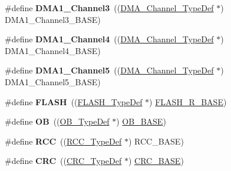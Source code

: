 \begin{DoxyCompactItemize}
\#define {\bfseries D\+M\+A1\+\_\+\+Channel3}~((\hyperlink{struct_d_m_a___channel___type_def}{D\+M\+A\+\_\+\+Channel\+\_\+\+Type\+Def} $\ast$) D\+M\+A1\+\_\+\+Channel3\+\_\+\+B\+A\+SE)
\item 
\mbox{\label{group___peripheral__declaration_gad2c42743316bf64da557130061b1f56a}} 
\#define {\bfseries D\+M\+A1\+\_\+\+Channel4}~((\hyperlink{struct_d_m_a___channel___type_def}{D\+M\+A\+\_\+\+Channel\+\_\+\+Type\+Def} $\ast$) D\+M\+A1\+\_\+\+Channel4\+\_\+\+B\+A\+SE)
\item 
\mbox{\label{group___peripheral__declaration_ga06ff98ddef3c962795d2e2444004abff}} 
\#define {\bfseries D\+M\+A1\+\_\+\+Channel5}~((\hyperlink{struct_d_m_a___channel___type_def}{D\+M\+A\+\_\+\+Channel\+\_\+\+Type\+Def} $\ast$) D\+M\+A1\+\_\+\+Channel5\+\_\+\+B\+A\+SE)
\item 
\mbox{\label{group___peripheral__declaration_ga844ea28ba1e0a5a0e497f16b61ea306b}} 
\#define {\bfseries F\+L\+A\+SH}~((\hyperlink{struct_f_l_a_s_h___type_def}{F\+L\+A\+S\+H\+\_\+\+Type\+Def} $\ast$) \hyperlink{group___peripheral__memory__map_ga8e21f4845015730c5731763169ec0e9b}{F\+L\+A\+S\+H\+\_\+\+R\+\_\+\+B\+A\+SE})
\item 
\mbox{\label{group___peripheral__declaration_gad2d5f875cdc6d696735f20fa23a895c3}} 
\#define {\bfseries OB}~((\hyperlink{struct_o_b___type_def}{O\+B\+\_\+\+Type\+Def} $\ast$) \hyperlink{group___peripheral__memory__map_gab5b5fb155f9ee15dfb6d757da1adc926}{O\+B\+\_\+\+B\+A\+SE})
\item 
\mbox{\label{group___peripheral__declaration_ga74944438a086975793d26ae48d5882d4}} 
\#define {\bfseries R\+CC}~((\hyperlink{struct_r_c_c___type_def}{R\+C\+C\+\_\+\+Type\+Def} $\ast$) R\+C\+C\+\_\+\+B\+A\+SE)
\item 
\mbox{\label{group___peripheral__declaration_ga4381bb54c2dbc34500521165aa7b89b1}} 
\#define {\bfseries C\+RC}~((\hyperlink{struct_c_r_c___type_def}{C\+R\+C\+\_\+\+Type\+Def} $\ast$) \hyperlink{group___peripheral__memory__map_ga656a447589e785594cbf2f45c835ad7e}{C\+R\+C\+\_\+\+B\+A\+SE})
\item 

\end{DoxyCompactItemize}
